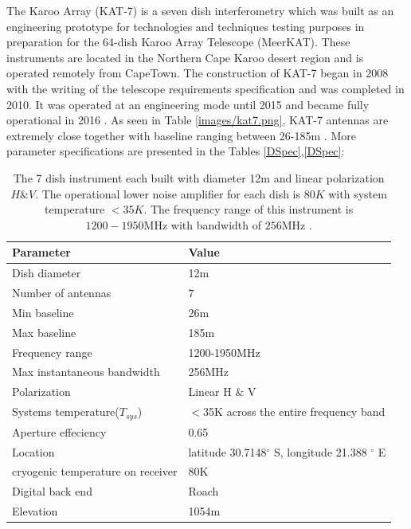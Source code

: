The Karoo Array (KAT-7) is a seven dish interferometry which was built as an engineering prototype for technologies and techniques testing purposes in preparation for the 64-dish Karoo Array Telescope (MeerKAT). These instruments are located in the Northern Cape Karoo desert region and is operated remotely from CapeTown. The construction of  KAT-7 began in
2008 with the writing of the telescope requirements specification and was completed in 2010.  It was operated at an engineering mode until 2015  and became fully operational in 2016  \citep{foley2016engineering}. As seen in Table \ref{images/kat7.png}, KAT-7 antennas are extremely close together with baseline ranging between 26-185m \citep{carignan2013kat}. More parameter specifications are presented in the Tables \ref{DSpec},\ref{DSpec}:
\begin{table}[H]\centering
\begin{tabular}{l l }
\toprule
\textbf{Parameter} & \textbf{Value}\\
\midrule
Dish diameter&12m \\
Number of antennas& 7\\
Min baseline & 26m\\
Max baseline & 185m\\
Frequency range & 1200-1950MHz\\
Max instantaneous bandwidth &256MHz\\
Polarization   & Linear H $\&$ V\\
Systems temperature($T_{sys}$) & $<$35K across the entire frequency band\\
Aperture effeciency & 0.65\\
Location &  latitude 30.7148$^{\circ}$ S, longitude 21.388 $^{\circ}$ E\\
cryogenic temperature on receiver & 80K\\
Digital back end & Roach \\
Elevation & 1054m\\
\bottomrule
\end{tabular}
\caption{The 7 dish instrument each built with diameter 12m and linear polarization $H \& V$. The operational lower noise amplifier for each dish is $80K$  with system temperature $<35K$. The frequency range of this instrument is $1200-1950 \text{MHz}$ with bandwidth of $256\text{MHz}$ \citep{foley2016engineering}.}
\label{K7 spec}
\end{table}

